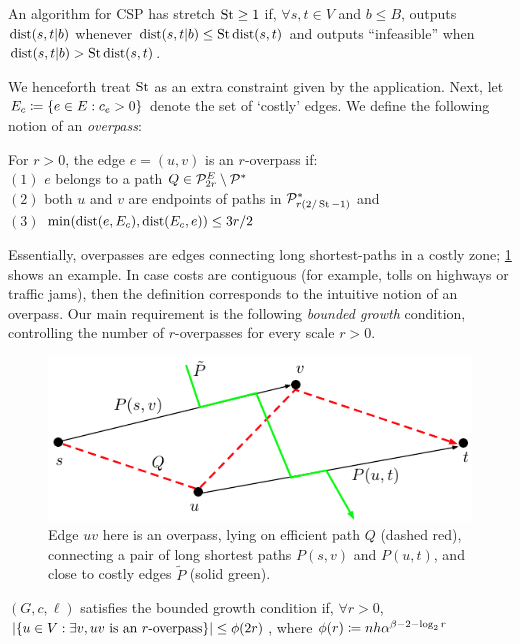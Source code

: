 \documentclass[opre,nonblindrev]{informs3} %
\begin{document}
\begin{definition}[Stretch]
	An algorithm for CSP has stretch $\operatorname{St}\geq 1$ if, $\forall s,t\in V$ and $b\leq B$, outputs $\mbox{dist}(s,t|b)$ whenever $\mbox{dist}(s,t|b)\leq \operatorname{St}\mbox{dist}(s,t)$ and outputs ``infeasible'' when $\mbox{dist}(s,t|b)>\operatorname{St}\mbox{dist}(s,t)$.
\end{definition}
We henceforth treat $\operatorname{St}$ as an extra constraint given by the application. 
Next, let $E_c\coloneqq\{e\in E:c_e>0\}$ denote the set of `costly' edges.
We define the following notion of an \emph{overpass}:

\begin{definition}[Overpass]
For $r>0$, the edge $e=(u,v)$ is an $r$-overpass if:\\
$(1)$ $e$ belongs to a path $Q\in\mathcal{P}^E_{2r}\setminus\mathcal{P}^*$\\
$(2)$ both $u$ and $v$ are endpoints of paths in $\mathcal{P}^*_{r(2/\operatorname{St}-1)}$ and\\ 
$(3)$ $\min(\mbox{dist}(e,E_c),\mbox{dist}(E_c,e))\leq 3r/2$
\end{definition} 
Essentially, overpasses are edges connecting long shortest-paths in a costly zone; \cref{fig:overpass} shows an example. In case costs are contiguous (for example, tolls on highways or traffic jams), then the definition corresponds to the intuitive notion of an overpass.
Our main requirement is the following \emph{bounded growth} condition, controlling the number of $r$-overpasses for every scale $r>0$.

\begin{figure}[!b]
	\centering
	\includegraphics[scale=0.7]{TexImg/overpass.pdf}
	\caption{Edge $uv$ here is an overpass, lying on efficient path $Q$ (dashed red), connecting a pair of long shortest paths $P(s,v)$ and $P(u,t)$, and close to costly edges $\tilde P$ (solid green). } 
	\label{fig:overpass}
\end{figure}


\begin{definition}
$(G,c,\ell)$ satisfies the bounded growth condition if, $\forall r>0$, $\lvert\{u\in V: \exists v, uv \text{ is an $r$-overpass}\}\rvert\leq \phi(2r)$, where $\phi(r)\coloneqq nh\alpha^{\beta-2-\log_2r}$
\end{definition}
\end{document}
